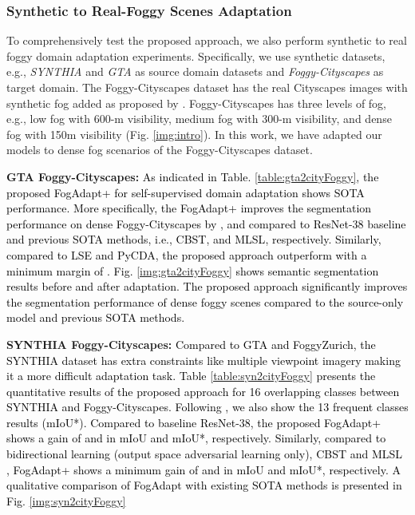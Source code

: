 \documentclass[final,5p,times,twocolumn]{elsarticle}
\begin{document}
\subsubsection{Synthetic to Real-Foggy Scenes Adaptation}
To comprehensively test the proposed approach, we also perform synthetic to real foggy domain adaptation experiments. Specifically, we use synthetic datasets, e.g., \textit{SYNTHIA} and \textit{GTA} as source domain datasets and \textit{Foggy-Cityscapes} as target domain. The Foggy-Cityscapes dataset has the real Cityscapes images with synthetic fog added as proposed by \cite{dai2019curriculum}. Foggy-Cityscapes has three levels of fog, e.g., low fog with 600-m visibility, medium fog with 300-m visibility, and dense fog with 150m visibility (Fig. \ref{img:intro}). In this work, we have adapted our models to dense fog scenarios of the Foggy-Cityscapes dataset.   

\textbf{GTA  Foggy-Cityscapes: } 
\textcolor{black}{
As indicated in Table. \ref{table:gta2cityFoggy}, the proposed FogAdapt+ for self-supervised domain adaptation shows SOTA performance. 
More specifically, the FogAdapt+ improves the segmentation performance on dense Foggy-Cityscapes by ,  and   compared to ResNet-38 baseline and previous SOTA methods, i.e., CBST\cite{zou2018unsupervised}, and MLSL\cite{mlsl2020},  respectively. 
Similarly, compared to LSE\cite{LSE_2020_Naseer} and PyCDA\cite{Lian_2019_pycda}, the proposed approach outperform with a minimum margin of . 
Fig. \ref{img:gta2cityFoggy} shows semantic segmentation results before and after adaptation.
The proposed approach significantly improves the segmentation performance of dense foggy scenes compared to the source-only model and previous SOTA methods.
}


\textbf{SYNTHIA  Foggy-Cityscapes: } 
\textcolor{black}{
Compared to GTA and FoggyZurich, the SYNTHIA dataset has extra constraints like multiple viewpoint imagery making it a more difficult adaptation task. Table \ref{table:syn2cityFoggy} presents the quantitative results of the proposed approach for 16 overlapping classes between SYNTHIA and Foggy-Cityscapes. Following \cite{ tsai2018learning, clan_2019_CVPR}, we also show the 13 frequent classes results (mIoU*). Compared to baseline ResNet-38, the proposed FogAdapt+ shows a gain of  and  in mIoU and mIoU*, respectively.  
Similarly, compared to bidirectional learning \cite{kim2019bidirectional} (output space adversarial learning only), CBST \cite{zou2018unsupervised} and MLSL \cite{mlsl2020}, FogAdapt+ shows a minimum gain of  and  in mIoU and mIoU*,  respectively.
A qualitative comparison of FogAdapt with existing SOTA methods is presented in Fig. \ref{img:syn2cityFoggy}
}
\end{document}
